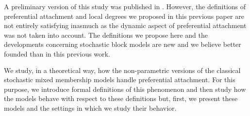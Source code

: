 
A preliminary version of this study was published in \cite{dulac2017study}. However, the definitions of preferential attachment and local degrees we proposed in this previous paper are not entirely satisfying inasmuch as the dynamic aspect of preferential attachment was not taken into account. The definitions we propose here and the developments concerning stochastic block models are new and we believe better founded than in this previous work.

We study, in a theoretical way, how the non-parametric versions of the classical stochastic mixed membership models handle preferential attachment. For this purpose, we introduce formal definitions of this phenomenon and then study how the models behave with respect  to these definitions but, first,  we present these models and the settings in which we study their behavior.

